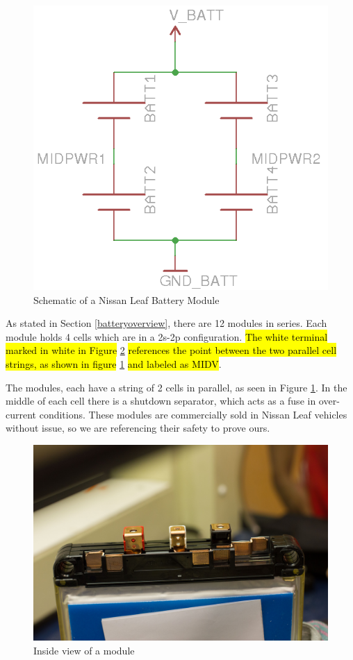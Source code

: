\documentclass{article}
\DeclareRobustCommand{\hlr}[1]{{\sethlcolor{red}\hl{#1}}}
\begin{document}
            \begin{figure}[H]
            \centering
            \includegraphics{moduleschem}
            \caption{Schematic of a Nissan Leaf Battery Module}
            \label{module}
            \end{figure}

            As stated in Section \ref{batteryoverview}, there are 12 modules in series. Each module holds 4 cells which are in a 2s-2p configuration. \hlr{The white terminal marked in white in Figure} \ref{canopener} \hlr{references the point between the two parallel cell strings, as shown in figure} \ref{module} \hlr{and labeled as MIDV}.

            The modules, each have a string of 2 cells in parallel, as seen in Figure \ref{module}. In the middle of each cell there is a shutdown separator, which acts as a fuse in over-current conditions. These modules are commercially sold in Nissan Leaf vehicles without issue, so we are referencing their safety to prove ours.

            \begin{figure}[H]
                \centering
                \includegraphics[width = 0.6 \textwidth]{OpenModule}
                \caption{Inside view of a module}
                \label{canopener}
            \end{figure}
\end{document}

